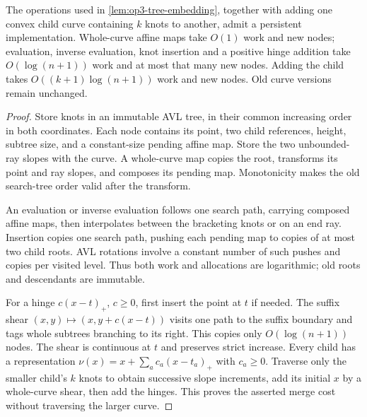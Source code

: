 \begin{lemma}
\label{lem:op3-persistent-primitives}
The operations used in \cref{lem:op3-tree-embedding}, together with adding
one convex child curve containing $k$ knots to another, admit a persistent
implementation. Whole-curve affine maps take $O(1)$ work and new nodes;
evaluation, inverse evaluation, knot insertion and a positive hinge
addition take $O(\log(n+1))$ work and at most that many new nodes. Adding
the child takes $O((k+1)\log(n+1))$ work and new nodes. Old curve versions
remain unchanged.
\end{lemma}
\begin{proof}
Store knots in an immutable AVL tree, in their common increasing order in
both coordinates. Each node contains its point, two child references,
height, subtree size, and a constant-size pending affine map. Store the two
unbounded-ray slopes with the curve. A whole-curve map copies the root,
transforms its point and ray slopes, and composes its pending map.
Monotonicity makes the old search-tree order valid after the transform.

An evaluation or inverse evaluation follows one search path, carrying
composed affine maps, then interpolates between the bracketing knots or
on an end ray. Insertion copies one search path, pushing each pending map
to copies of at most two child roots. AVL rotations involve a constant
number of such pushes and copies per visited level. Thus both work and
allocations are logarithmic; old roots and descendants are immutable.

For a hinge $c(x-t)_+$, $c\geq0$, first insert the point at $t$ if needed.
The suffix shear $(x,y)\mapsto(x,y+c(x-t))$ visits one path to the suffix
boundary and tags whole subtrees branching to its right. This copies only
$O(\log(n+1))$ nodes. The shear is continuous at $t$ and preserves strict
increase. Every child has a representation
$\nu(x)=x+\sum_a c_a(x-t_a)_+$ with $c_a\geq0$.
Traverse only the smaller child's $k$ knots to obtain successive slope
increments, add its initial $x$ by a whole-curve shear, then add the hinges.
This proves the asserted merge cost without traversing the larger curve.
\end{proof}

